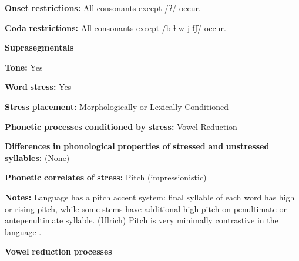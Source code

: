 \begin{styleBody}
\textbf{Onset} \textbf{restrictions:} All consonants except /ʔ/ occur.
\end{styleBody}

\begin{styleBody}
\textbf{Coda} \textbf{restrictions:} All consonants except /b ɬ w j t͡ʃ/ occur.
\end{styleBody}

\begin{styleBody}
\textbf{Suprasegmentals}
\end{styleBody}

\begin{styleBody}
\textbf{Tone:} Yes
\end{styleBody}

\begin{styleBody}
\textbf{Word} \textbf{stress:} Yes
\end{styleBody}

\begin{styleBody}
\textbf{Stress} \textbf{placement:} Morphologically or Lexically Conditioned
\end{styleBody}

\begin{styleBody}
\textbf{Phonetic} \textbf{processes} \textbf{conditioned} \textbf{by} \textbf{stress:} Vowel Reduction
\end{styleBody}

\begin{styleBody}
\textbf{Differences} \textbf{in} \textbf{phonological} \textbf{properties} \textbf{of} \textbf{stressed} \textbf{and} \textbf{unstressed} \textbf{syllables:} (None)
\end{styleBody}

\begin{styleBody}
\textbf{Phonetic} \textbf{correlates} \textbf{of} \textbf{stress:} Pitch (impressionistic)
\end{styleBody}

\begin{styleBody}
\textbf{Notes:} Language has a pitch accent system: final syllable of each word has high or rising pitch, while some stems have additional high pitch on penultimate or antepenultimate syllable. (Ulrich) Pitch is very minimally contrastive in the language \citep[17]{Broadwell2006}.
\end{styleBody}

\begin{styleBody}
\textbf{Vowel} \textbf{reduction} \textbf{processes}
\end{styleBody}

